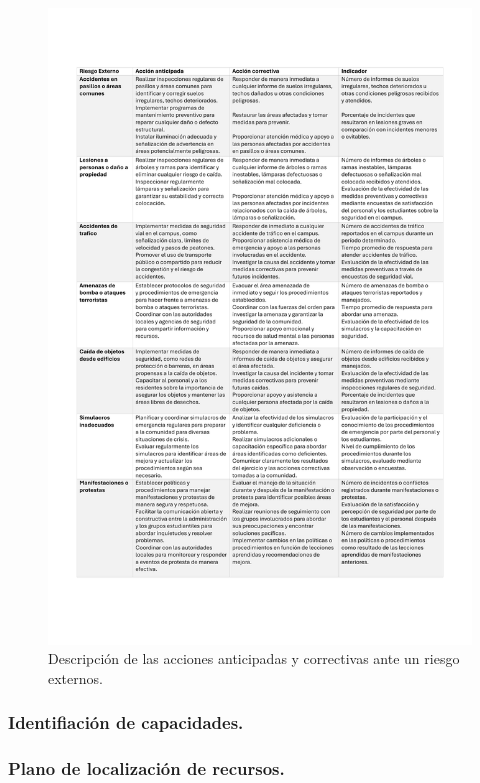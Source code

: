     \begin{figure}[H]
        \centering
        \includegraphics[scale=0.3]{15/img/tablaPlanDeAccionRiesgosExternos.pdf}
        \caption{Descripción de las acciones anticipadas y correctivas ante un riesgo externos.}
        \label{fig:tablaPlanDeAccionRiesgosExternos}
    \end{figure}
    
    \subsubsection{Identifiación de capacidades.}
    \subsubsection{Plano de localización de recursos.}
